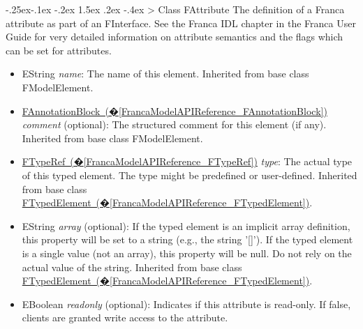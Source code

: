 \documentclass[a4paper,10pt]{scrreprt}
\makeatletter
\renewcommand\subsection{\medskip\@startsection{subsection}{2}{\z@}%
  {-.25ex\@plus -.1ex \@minus -.2ex}%
  {1.5ex \@plus .2ex \@minus -.4ex}%
  {\ifnum \scr@compatibility>\@nameuse{scr@v@2.96}\relax
    \setlength{\parfillskip}{\z@ plus 1fil}\fi
    \raggedsection\normalfont\sectfont\nobreak\size@subsection
  }%
}
\newlength{\XdocItemIndent}
\makeatother
\begin{document}
\subsection{Class FAttribute}
\label{FrancaModelAPIReference_FAttribute}
The definition of a Franca attribute as part of an FInterface.
See the Franca IDL chapter in the Franca User Guide for very
detailed information on attribute semantics and the flags
which can be set for attributes.
\setlength{\XdocItemIndent}{\textwidth}
\begin{itemize}
\addtolength{\XdocItemIndent}{-2.5em}
\item \begin{minipage}[t]{\XdocItemIndent}
EString \textit{name}: The name of this element.
		 Inherited from base class FModelElement.

\end{minipage}
\item \begin{minipage}[t]{\XdocItemIndent}
\hyperref[FrancaModelAPIReference_FAnnotationBlock]{FAnnotationBlock~(�\ref*{FrancaModelAPIReference_FAnnotationBlock})} \textit{comment} (optional): The structured comment for this element (if any).
		 Inherited from base class FModelElement.

\end{minipage}
\item \begin{minipage}[t]{\XdocItemIndent}
\hyperref[FrancaModelAPIReference_FTypeRef]{FTypeRef~(�\ref*{FrancaModelAPIReference_FTypeRef})} \textit{type}: The actual type of this typed element. The type might be predefined or user-defined.
		 Inherited from base class \hyperref[FrancaModelAPIReference_FTypedElement]{FTypedElement~(�\ref*{FrancaModelAPIReference_FTypedElement})}.

\end{minipage}
\item \begin{minipage}[t]{\XdocItemIndent}
EString \textit{array} (optional): If the typed element is an implicit array definition, this property will be set to a string (e.g., the string '[]'). If the typed element is a single value (not an array), this property will be null. Do not rely on the actual value of the string.
		 Inherited from base class \hyperref[FrancaModelAPIReference_FTypedElement]{FTypedElement~(�\ref*{FrancaModelAPIReference_FTypedElement})}.

\end{minipage}
\item \begin{minipage}[t]{\XdocItemIndent}
EBoolean \textit{readonly} (optional): Indicates if this attribute is read-only. If false, clients are granted write access to the attribute.


\end{minipage}
\end{itemize}
\end{document}
